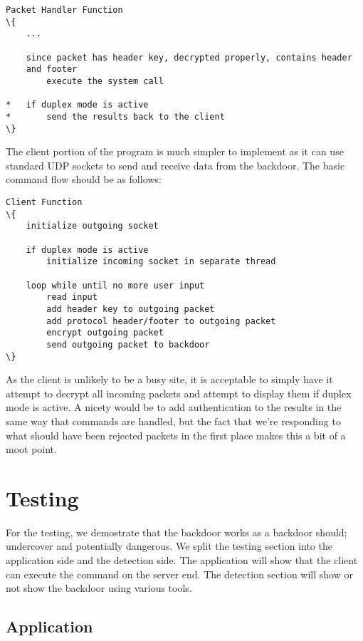 \documentclass[titlepage]{article}
\begin{document}
\begin{lstlisting}
Packet Handler Function
\{
	...

	since packet has header key, decrypted properly, contains header
	and footer
		execute the system call
	
*	if duplex mode is active
*		send the results back to the client
\}
\end{lstlisting}

\clearpage

The client portion of the program is much simpler to implement as
it can use standard UDP sockets to send and receive data from the
backdoor. The basic command flow should be as follows:

\begin{lstlisting}
Client Function
\{
	initialize outgoing socket

	if duplex mode is active
		initialize incoming socket in separate thread

	loop while until no more user input
		read input
		add header key to outgoing packet
		add protocol header/footer to outgoing packet
		encrypt outgoing packet
		send outgoing packet to backdoor
\}
\end{lstlisting}

As the client is unlikely to be a busy site, it is acceptable to
simply have it attempt to decrypt all incoming packets and attempt
to display them if duplex mode is active. A nicety would be to
add authentication to the results in the same way that commands
are handled, but the fact that we're responding to what should have
been rejected packets in the first place makes this a bit of a moot
point.

\clearpage

\section{Testing}

For the testing, we demostrate that the backdoor works as a backdoor should; undercover
and potentially dangerous.  We split the testing section into the application side and
the detection side.  The application will show that the client can execute the command
on the server end.  The detection section will show or not show the backdoor using
various tools.

\subsection{Application}
\end{document}
